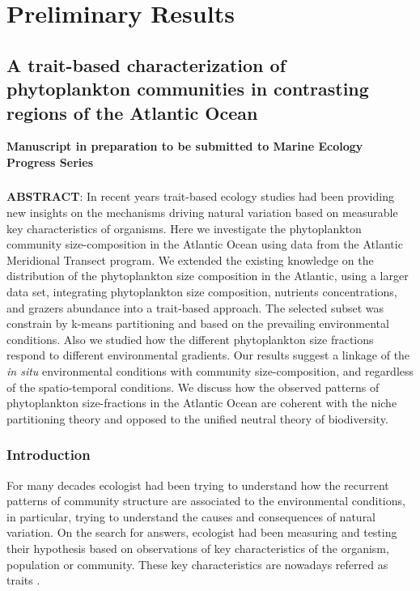 \chapter{Preliminary Results}
\section{A trait-based characterization of phytoplankton communities in contrasting regions of the Atlantic Ocean}

\small {\textbf{Manuscript in preparation to be submitted to Marine Ecology Progress Series}}


\subsection*{}
\textbf{ABSTRACT}: In recent years trait-based ecology studies had been providing new insights on the mechanisms driving natural variation based on measurable key characteristics of organisms. Here we investigate the phytoplankton community size-composition in the Atlantic Ocean using data from the Atlantic Meridional Transect program. We extended the existing knowledge on the distribution of the phytoplankton size composition in the Atlantic, using a larger data set, integrating phytoplankton size composition, nutrients concentrations, and grazers abundance into a trait-based approach. The selected subset was constrain by k-means partitioning and based on the prevailing environmental conditions. Also we studied how the different phytoplankton size fractions respond to different environmental gradients. Our results suggest a linkage of the \textit{in situ} environmental conditions with community size-composition, and regardless of the spatio-temporal conditions. We discuss how the observed patterns of phytoplankton size-fractions in the Atlantic Ocean are coherent with the niche partitioning theory and opposed to the unified neutral theory of biodiversity.

\normalsize
\subsection{Introduction}
For many decades ecologist had been trying to understand how the recurrent patterns of community structure are associated to the environmental conditions, in particular, trying to understand the causes and consequences of natural variation. On the search for answers, ecologist had been measuring and testing their hypothesis based on observations of key characteristics of the organism, population or community. These key characteristics are nowadays referred as traits \citep{McGill2006, Violle2007}. 

